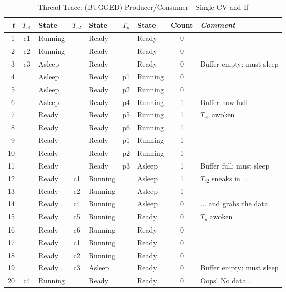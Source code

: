 \documentclass{article}
\begin{document}
\begin{table}[h!]
    \begin{center}
        \caption*{Thread Trace: (BUGGED) Producer/Consumer - Single CV and If}
        \label{tab:table1}
        \begin{tabular}{r|cl|cl|cl|c|l}
            \textit{t} & $T_{c1}$ & State & $T_{c2}$ & State & $T_{p}$ & State & Count & \textit{Comment}\\
            \hline
            1  & c1 & Running &    & Ready   &    & Ready   & 0 &  \\
            2  & c2 & Running &    & Ready   &    & Ready   & 0 &  \\
            3  & c3 & Asleep  &    & Ready   &    & Ready   & 0 &  Buffer empty; must sleep \\  \hline
            4  &    & Asleep  &    & Ready   & p1 & Running & 0 &  \\
            5  &    & Asleep  &    & Ready   & p2 & Running & 0 &  \\
            6  &    & Asleep  &    & Ready   & p4 & Running & 1 &  Buffer now full \\
            7  &    & Ready   &    & Ready   & p5 & Running & 1 &  $T_{c1}$ awoken \\
            8  &    & Ready   &    & Ready   & p6 & Running & 1 &  \\
            9  &    & Ready   &    & Ready   & p1 & Running & 1 &  \\
            10 &    & Ready   &    & Ready   & p2 & Running & 1 &  \\
            11 &    & Ready   &    & Ready   & p3 & Asleep  & 1 &  Buffer full; must sleep \\  \hline
            12 &    & Ready   & c1 & Running &    & Asleep  & 1 &  $T_{c2}$ sneaks in ... \\
            13 &    & Ready   & c2 & Running &    & Asleep  & 1 &  \\
            14 &    & Ready   & c4 & Running &    & Asleep  & 0 &  ... and grabs the data \\
            15 &    & Ready   & c5 & Running &    & Ready   & 0 &  $T_{p}$ awoken \\
            16 &    & Ready   & c6 & Running &    & Ready   & 0 &  \\
            17 &    & Ready   & c1 & Running &    & Ready   & 0 &  \\
            18 &    & Ready   & c2 & Running &    & Ready   & 0 &  \\
            19 &    & Ready   & c3 & Asleep  &    & Ready   & 0 &  Buffer empty; must sleep \\  \hline
            20 & c4 & Running &    & Ready   &    & Ready   & 0 &  Oops! No data... \\  \hline
        \end{tabular}
    \end{center}
\end{table}
\end{document}

